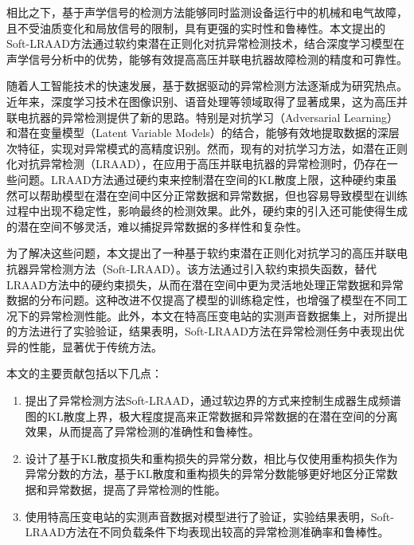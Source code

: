 \documentclass{article}
\begin{document}
相比之下，基于声学信号的检测方法能够同时监测设备运行中的机械和电气故障，且不受油质变化和局放信号的限制，具有更强的实时性和鲁棒性\cite{ilkhechi2021applications,gao2022early}。本文提出的Soft-LRAAD方法通过软约束潜在正则化对抗异常检测技术，结合深度学习模型在声学信号分析中的优势，能够有效提高高压并联电抗器故障检测的精度和可靠性。

随着人工智能技术的快速发展，基于数据驱动的异常检测方法逐渐成为研究热点。近年来，深度学习技术在图像识别、语音处理等领域取得了显著成果，这为高压并联电抗器的异常检测提供了新的思路。特别是对抗学习（Adversarial Learning）和潜在变量模型（Latent Variable Models）的结合，能够有效地提取数据的深层次特征，实现对异常模式的高精度识别。然而，现有的对抗学习方法，如潜在正则化对抗异常检测（LRAAD），在应用于高压并联电抗器的异常检测时，仍存在一些问题。LRAAD方法通过硬约束来控制潜在空间的KL散度上限，这种硬约束虽然可以帮助模型在潜在空间中区分正常数据和异常数据，但也容易导致模型在训练过程中出现不稳定性，影响最终的检测效果。此外，硬约束的引入还可能使得生成的潜在空间不够灵活，难以捕捉异常数据的多样性和复杂性。

为了解决这些问题，本文提出了一种基于软约束潜在正则化对抗学习的高压并联电抗器异常检测方法（Soft-LRAAD）。该方法通过引入软约束损失函数，替代LRAAD方法中的硬约束损失，从而在潜在空间中更为灵活地处理正常数据和异常数据的分布问题。这种改进不仅提高了模型的训练稳定性，也增强了模型在不同工况下的异常检测性能。此外，本文在特高压变电站的实测声音数据集上，对所提出的方法进行了实验验证，结果表明，Soft-LRAAD方法在异常检测任务中表现出优异的性能，显著优于传统方法。


本文的主要贡献包括以下几点：

\begin{enumerate}

  \item 提出了异常检测方法Soft-LRAAD，通过软边界的方式来控制生成器生成频谱图的KL散度上界，极大程度提高来正常数据和异常数据的在潜在空间的分离效果，从而提高了异常检测的准确性和鲁棒性。

  \item 设计了基于KL散度损失和重构损失的异常分数，相比与仅使用重构损失作为异常分数的方法，基于KL散度和重构损失的异常分数能够更好地区分正常数据和异常数据，提高了异常检测的性能。

  \item 使用特高压变电站的实测声音数据对模型进行了验证，实验结果表明，Soft-LRAAD方法在不同负载条件下均表现出较高的异常检测准确率和鲁棒性。

\end{enumerate}
\end{document}
